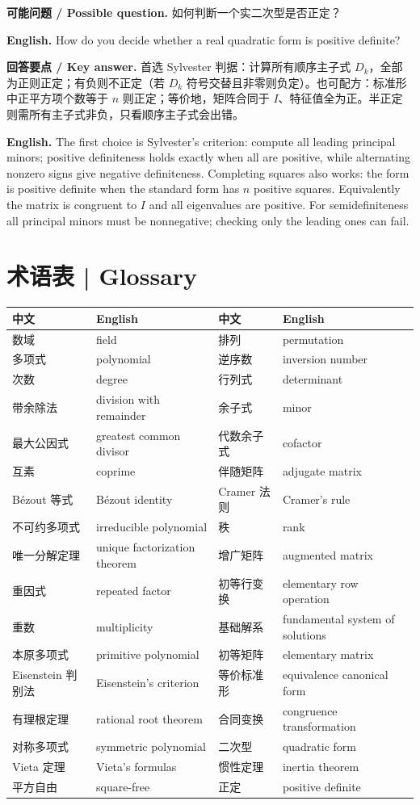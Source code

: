 \documentclass[UTF8,11pt,a4paper]{ctexart}
\newcommand{\EN}[1]{\par\noindent\textbf{English.} #1\par}
\newcommand{\ASK}[4]{\par\noindent\textbf{可能问题 / Possible question.} #1\par\EN{#2}\noindent\textbf{回答要点 / Key answer.} #3\par\EN{#4}\medskip}
\begin{document}
\ASK{如何判断一个实二次型是否正定？}{How do you decide whether a real quadratic form is positive definite?}{首选 Sylvester 判据：计算所有顺序主子式 $D_k$，全部为正则正定；有负则不正定（若 $D_k$ 符号交替且非零则负定）。也可配方：标准形中正平方项个数等于 $n$ 则正定；等价地，矩阵合同于 $I$、特征值全为正。半正定则需所有主子式非负，只看顺序主子式会出错。}{The first choice is Sylvester's criterion: compute all leading principal minors; positive definiteness holds exactly when all are positive, while alternating nonzero signs give negative definiteness. Completing squares also works: the form is positive definite when the standard form has $n$ positive squares. Equivalently the matrix is congruent to $I$ and all eigenvalues are positive. For semidefiniteness all principal minors must be nonnegative; checking only the leading ones can fail.}

\section*{术语表 | Glossary}
\small\setlength{\tabcolsep}{2.5pt}
\begin{tabular}{p{3.1cm}p{4.55cm}p{3.1cm}p{4.55cm}}
\toprule
中文 & English & 中文 & English\\
\midrule
数域 & field & 排列 & permutation\\
多项式 & polynomial & 逆序数 & inversion number\\
次数 & degree & 行列式 & determinant\\
带余除法 & division with remainder & 余子式 & minor\\
最大公因式 & greatest common divisor & 代数余子式 & cofactor\\
互素 & coprime & 伴随矩阵 & adjugate matrix\\
Bézout 等式 & Bézout identity & Cramer 法则 & Cramer's rule\\
不可约多项式 & irreducible polynomial & 秩 & rank\\
唯一分解定理 & unique factorization theorem & 增广矩阵 & augmented matrix\\
重因式 & repeated factor & 初等行变换 & elementary row operation\\
重数 & multiplicity & 基础解系 & fundamental system of solutions\\
本原多项式 & primitive polynomial & 初等矩阵 & elementary matrix\\
Eisenstein 判别法 & Eisenstein's criterion & 等价标准形 & equivalence canonical form\\
有理根定理 & rational root theorem & 合同变换 & congruence transformation\\
对称多项式 & symmetric polynomial & 二次型 & quadratic form\\
Vieta 定理 & Vieta's formulas & 惯性定理 & inertia theorem\\
平方自由 & square-free & 正定 & positive definite\\
\bottomrule
\end{tabular}
\end{document}
